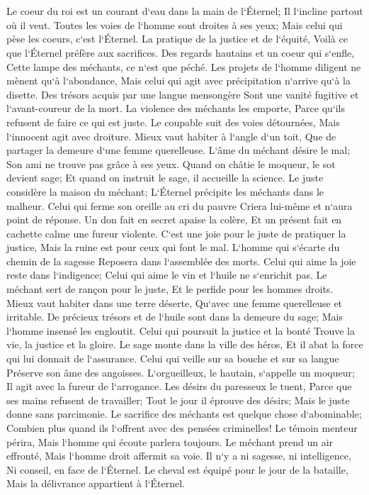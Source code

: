 \chapter{}

\verse Le coeur du roi est un courant d`eau dans la main de l`Éternel; Il l`incline partout où il veut. 
\verse Toutes les voies de l`homme sont droites à ses yeux; Mais celui qui pèse les coeurs, c`est l`Éternel. 
\verse La pratique de la justice et de l`équité, Voilà ce que l`Éternel préfère aux sacrifices. 
\verse Des regards hautains et un coeur qui s`enfle, Cette lampe des méchants, ce n`est que péché. 
\verse Les projets de l`homme diligent ne mènent qu`à l`abondance, Mais celui qui agit avec précipitation n`arrive qu`à la disette. 
\verse Des trésors acquis par une langue mensongère Sont une vanité fugitive et l`avant-coureur de la mort. 
\verse La violence des méchants les emporte, Parce qu`ils refusent de faire ce qui est juste. 
\verse Le coupable suit des voies détournées, Mais l`innocent agit avec droiture. 
\verse Mieux vaut habiter à l`angle d`un toit, Que de partager la demeure d`une femme querelleuse. 
\verse L`âme du méchant désire le mal; Son ami ne trouve pas grâce à ses yeux. 
\verse Quand on châtie le moqueur, le sot devient sage; Et quand on instruit le sage, il accueille la science. 
\verse Le juste considère la maison du méchant; L`Éternel précipite les méchants dans le malheur. 
\verse Celui qui ferme son oreille au cri du pauvre Criera lui-même et n`aura point de réponse. 
\verse Un don fait en secret apaise la colère, Et un présent fait en cachette calme une fureur violente. 
\verse C`est une joie pour le juste de pratiquer la justice, Mais la ruine est pour ceux qui font le mal. 
\verse L`homme qui s`écarte du chemin de la sagesse Reposera dans l`assemblée des morts. 
\verse Celui qui aime la joie reste dans l`indigence; Celui qui aime le vin et l`huile ne s`enrichit pas. 
\verse Le méchant sert de rançon pour le juste, Et le perfide pour les hommes droits. 
\verse Mieux vaut habiter dans une terre déserte, Qu`avec une femme querelleuse et irritable. 
\verse De précieux trésors et de l`huile sont dans la demeure du sage; Mais l`homme insensé les engloutit. 
\verse Celui qui poursuit la justice et la bonté Trouve la vie, la justice et la gloire. 
\verse Le sage monte dans la ville des héros, Et il abat la force qui lui donnait de l`assurance. 
\verse Celui qui veille sur sa bouche et sur sa langue Préserve son âme des angoisses. 
\verse L`orgueilleux, le hautain, s`appelle un moqueur; Il agit avec la fureur de l`arrogance. 
\verse Les désirs du paresseux le tuent, Parce que ses mains refusent de travailler; 
\verse Tout le jour il éprouve des désirs; Mais le juste donne sans parcimonie. 
\verse Le sacrifice des méchants est quelque chose d`abominable; Combien plus quand ils l`offrent avec des pensées criminelles! 
\verse Le témoin menteur périra, Mais l`homme qui écoute parlera toujours. 
\verse Le méchant prend un air effronté, Mais l`homme droit affermit sa voie. 
\verse Il n`y a ni sagesse, ni intelligence, Ni conseil, en face de l`Éternel. 
\verse Le cheval est équipé pour le jour de la bataille, Mais la délivrance appartient à l`Éternel. 

